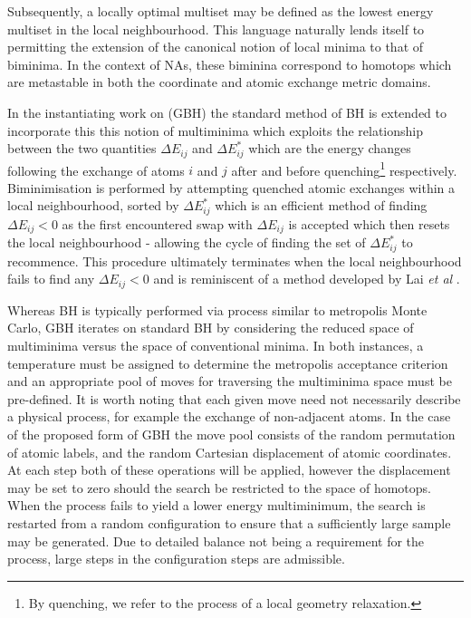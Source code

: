 Subsequently, a locally optimal multiset may be defined as the lowest energy multiset in the local neighbourhood. This language naturally lends itself to permitting the extension of the canonical notion of local minima to that of biminima. In the context of NAs, these biminina correspond to homotops which are metastable in both the coordinate and atomic exchange metric domains. 

In the instantiating work on (GBH) the standard method of BH \cite{doi:10.1021/jp970984n} is extended to incorporate this this notion of multiminima \cite{C5CP01198A} which exploits the relationship between the two quantities $\Delta E_{ij}$ and $\Delta E_{ij}^{*}$ which are the energy changes following the exchange of atoms $i$ and $j$ after and before quenching\footnote[1]{By quenching, we refer to the process of a local geometry relaxation.} respectively. Biminimisation is performed by attempting quenched atomic exchanges within a local neighbourhood, sorted by $\Delta E_{ij}^{*}$ which is an efficient method of finding $\Delta E_{ij} < 0$ as the first encountered swap with $\Delta E_{ij}$  is accepted which then resets the local neighbourhood - allowing the cycle of finding the set of $\Delta E_{ij}^{*}$ to recommence. This procedure ultimately terminates when the local neighbourhood fails to find any $\Delta E_{ij} < 0$ and is reminiscent of a method developed by Lai \textit{ et al} \cite{10.1063/1.3656766}. 

Whereas BH is typically performed via process similar to metropolis Monte Carlo, GBH iterates on standard BH by considering the reduced space of multiminima versus the space of conventional minima. In both instances, a temperature must be assigned to determine the metropolis acceptance criterion and an appropriate pool of moves for traversing the multiminima space must be pre-defined. It is worth noting that each given move need not necessarily describe a physical process, for example the exchange of non-adjacent atoms. In the case of the proposed form of GBH the move pool consists of the random permutation of atomic labels, and the random Cartesian displacement of atomic coordinates. At each step both of these operations will be applied, however the displacement may be set to zero should the search be restricted to the space of homotops. When the process fails to yield a lower energy multiminimum, the search is restarted from a random configuration to ensure that a sufficiently large sample may be generated. Due to detailed balance not being a requirement for the process, large steps in the configuration steps are admissible.

